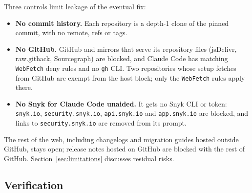 \documentclass[11pt]{article}
\theoremstyle{definition}
\newcommand{\unaided}{Claude Code unaided}
\begin{document}
Three controls limit leakage of the eventual fix:
\begin{itemize}
  \item \textbf{No commit history.} Each repository is a depth-1 clone of the pinned commit, with no remote, refs or tags.
  \item \textbf{No GitHub.} GitHub and mirrors that serve its repository files (jsDelivr, raw.githack, Sourcegraph) are blocked, and Claude Code has matching \texttt{WebFetch} deny rules and no \texttt{gh} CLI. Two repositories whose setup fetches from GitHub are exempt from the host block; only the \texttt{WebFetch} rules apply there.
  \item \textbf{No Snyk for \unaided{}.} It gets no Snyk CLI or token: \texttt{snyk.io}, \texttt{security.\allowbreak snyk.io}, \texttt{api.snyk.io} and \texttt{app.snyk.io} are blocked, and links to \texttt{security.\allowbreak snyk.io} are removed from its prompt.
\end{itemize}
The rest of the web, including changelogs and migration guides hosted outside GitHub, stays open; release notes hosted on GitHub are blocked with the rest of GitHub. Section~\ref{sec:limitations} discusses residual risks.

\subsection{Verification}
\label{sec:verification}
\end{document}
